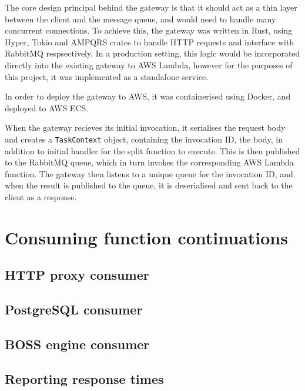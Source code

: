 The core design principal behind the gateway is that it should act as a thin layer between the client and the message queue, and would need to handle many concurrent connections. To achieve this, the gateway was written in Rust, using Hyper, Tokio and AMPQRS crates to handle HTTP requests and interface with RabbitMQ respsectively. In a production setting, this logic would be incorporated directly into the existing gateway to AWS Lambda, however for the purposes of this project, it was implemented as a standalone service.

In order to deploy the gateway to AWS, it was containerised using Docker, and deployed to AWS ECS.

When the gateway recieves its initial invocation, it serialises the request body and creates a \verb|TaskContext| object, containing the invocation ID, the body, in addition to initial handler for the split function to execute. This is then published to the RabbitMQ queue, which in turn invokes the corresponding AWS Lambda function. The gateway then listens to a unique queue for the invocation ID, and when the result is published to the queue, it is deserialised and sent back to the client as a response.

\section{Consuming function continuations}

\subsection{HTTP proxy consumer}

\subsection{PostgreSQL \faaas{} consumer}

\subsection{BOSS \faaas{} engine consumer}

\subsection{Reporting response times}

